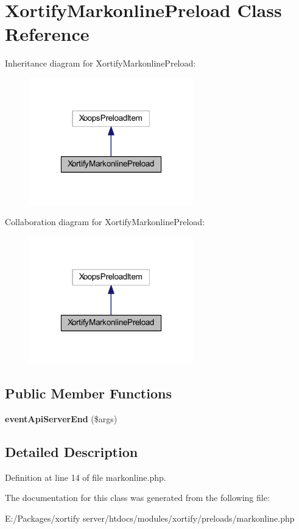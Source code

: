 \hypertarget{class_xortify_markonline_preload}{\section{Xortify\-Markonline\-Preload Class Reference}
\label{class_xortify_markonline_preload}
}


Inheritance diagram for Xortify\-Markonline\-Preload\-:
\nopagebreak
\begin{figure}[H]
\begin{center}
\leavevmode
\includegraphics[width=202pt]{class_xortify_markonline_preload__inherit__graph}
\end{center}
\end{figure}


Collaboration diagram for Xortify\-Markonline\-Preload\-:
\nopagebreak
\begin{figure}[H]
\begin{center}
\leavevmode
\includegraphics[width=202pt]{class_xortify_markonline_preload__coll__graph}
\end{center}
\end{figure}
\subsection*{Public Member Functions}
\begin{DoxyCompactItemize}
\item 
\hypertarget{class_xortify_markonline_preload_a62e459a2f1d1676b74b93eaa0e01bd02}{{\bfseries event\-Api\-Server\-End} (\$args)}\label{class_xortify_markonline_preload_a62e459a2f1d1676b74b93eaa0e01bd02}

\end{DoxyCompactItemize}


\subsection{Detailed Description}


Definition at line 14 of file markonline.\-php.



The documentation for this class was generated from the following file\-:\begin{DoxyCompactItemize}
\item 
E\-:/\-Packages/xortify server/htdocs/modules/xortify/preloads/markonline.\-php\end{DoxyCompactItemize}
